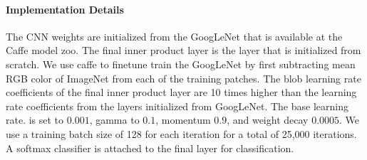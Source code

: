          
        \paragraph{Implementation Details}
             The CNN weights are initialized from the GoogLeNet that is available at the Caffe model zoo. The final inner product layer is the layer that is initialized from scratch. We use caffe \cite{jia2014} to finetune train the GoogLeNet by first subtracting mean RGB color of ImageNet from each of the training patches.  The blob learning rate coefficients of the final inner product layer are 10 times higher than the learning rate coefficients from the layers initialized from GoogLeNet.  The base learning rate. is set to  $0.001$,   gamma to $0.1$, momentum $0.9$, and weight decay $0.0005$.  We use a training batch size of 128 for each iteration for a total of 25,000 iterations.  A softmax classifier is attached to the final layer for classification.
    
    
    
         

